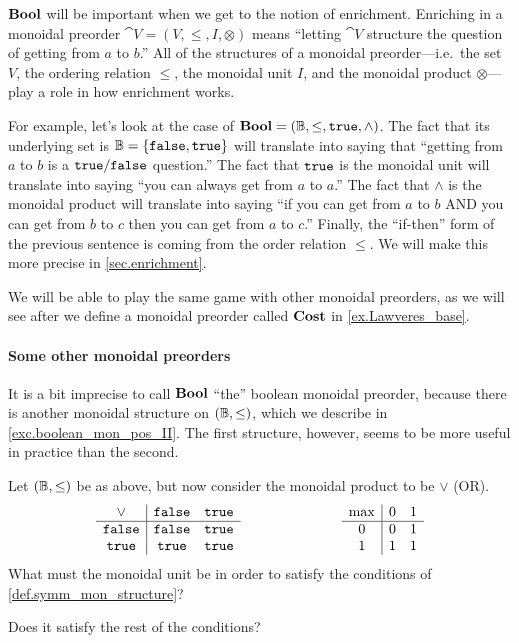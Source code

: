 \documentclass[7Sketches]{subfiles}
\begin{document}
$\mathbf{Bool}$ will be important when we get to the notion of enrichment. Enriching in a monoidal preorder $\cat{V}=(V,\leq,I,\otimes)$ means ``letting $\cat{V}$ structure the question of getting from $a$ to $b$.'' All of the structures of a monoidal preorder---i.e.\ the set $V$, the ordering relation $\leq$, the monoidal unit $I$, and the monoidal product $\otimes$---play a role in how enrichment works.

For example, let's look at the case of $\mathbf{Bool}=(\mathbb{B},\leq,\mathtt{true},\wedge)$. The fact that its underlying set is $\mathbb{B}=\{\mathtt{false},\mathtt{true}\}$ will translate into saying that ``getting from $a$ to $b$ is a $\mathtt{true}/\mathtt{false}$ question.'' The fact that $\mathtt{true}$ is the monoidal unit will translate into saying ``you can always get from $a$ to $a$.'' The fact that $\wedge$ is the monoidal product will translate into saying ``if you can get from $a$ to $b$ AND you can get from $b$ to $c$ then you can get from $a$ to $c$.'' Finally, the ``if-then'' form of the previous sentence is coming from the order relation $\leq$. We will make this more precise in \cref{sec.enrichment}.

We will be able to play the same game with other monoidal preorders, as we will see after we define a monoidal preorder called $\mathbf{Cost}$ in \cref{ex.Lawveres_base}.

\paragraph{Some other monoidal preorders}

It is a bit imprecise to call $\mathbf{Bool}$ ``the'' boolean monoidal preorder, because
there is another monoidal structure on $(\mathbb{B},\leq)$, which we describe in
\cref{exc.boolean_mon_pos_II}. The first structure, however, seems to be more useful in practice than the second.

\begin{exercise}%
\label{exc.boolean_mon_pos_II}%
Let $(\mathbb{B},\leq)$ be as above, but now consider the monoidal product to be $\vee$ (OR). 
\[
\begin{array}{c | c c}
	\vee&\mathtt{false}&\mathtt{true}\\\hline
	\mathtt{false}&\mathtt{false}&\mathtt{true}\\
	\mathtt{true}&\mathtt{true}&\mathtt{true}
\end{array}
\hspace{1in}
\begin{array}{c | c c}
	\max&0&1\\\hline
	0&0&1\\
	1&1&1
\end{array}
\]
What must the monoidal unit be in order to satisfy the conditions of \cref{def.symm_mon_structure}? 

Does it satisfy the rest of the conditions?
\end{exercise}
\end{document}
